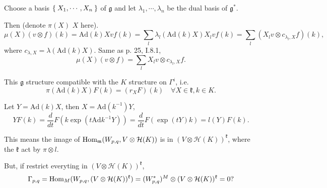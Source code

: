 \documentclass[12pt]{amsart}
\def\Hom{{\rm Hom}}
\def\Ad{{\rm Ad}}
\def\Ad{\mathrm{Ad}}
\def\fgg{\mathfrak{g}}
\def\fkk{\mathfrak{k}}
\def\chh{\mathcal{H}}
\def\fmm{\mathfrak{m}}
\begin{document}
Choose a basis $\Set{X_1, \cdots, X_n}$ of $\fgg$ and 
let $\lambda_1, \cdots,\lambda_n$ be the dual basis of $\fgg^*$.

Then (denote $\pi(X)$ $X$ here). 
\[
\mu(X) (v\otimes f)(k) = \Ad(k) X v f(k) = 
\sum_{l} \lambda_l(\Ad(k)X) X_l v f(k) 
= \sum_{l} (X_l v \otimes c_{\lambda_l,X} f)(k),
\]
where $c_{\lambda,X} = \lambda(\Ad(k)X)$.
Same as \cite{BorelWallach2000} p. 25, I.8.1,
\[
\mu(X) (v\otimes f) = \sum_l X_l v \otimes c_{\lambda_l,X} f. 
\]

This $\fgg$ structure compatible with the $K$ structure on $\Gamma^i$, i.e. 
\[
\pi(\Ad(k) X) F(k) = (r_X F)(k)\quad \forall X\in \fkk, k\in K.
\]

Let $Y=\Ad(k)X$, then $X = \Ad(k^{-1})Y$,
\[
YF(k) = \frac{d}{dt} F(k\exp(t\Ad k^{-1}Y))
= \frac{d}{dt} F(\exp(tY)k)
= l(Y)F (k). 
\]

This means the image of $\Hom_\fmm(W_{p,q},V\otimes \chh(K))$ is in 
$(V\otimes \chh(K))^\fkk$, where the $\fkk$ act by $\pi\otimes l$.

But, if restrict everyting in $(V\otimes \chh(K))^\fkk$, 
\[
\Gamma_{p,q} = \Hom_M(W_{p,q}, (V\otimes \chh(K))^\fkk)
=(W_{p,q}^*)^M \otimes (V\otimes \chh(K))^\fkk=0?
\] 


{}

\end{document}
